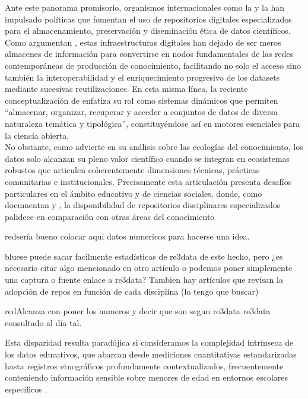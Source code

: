 \documentclass[runningheads]{llncs}
\def \bchregi {\begin{color}{red}}
\def \echregi {\end{color}}
\def \bchgon {\begin{color}{blue}}
\def \echgon {\end{color}}
\begin{document}
Ante este panorama promisorio, organismos internacionales como la \cite{unesco2021} y la \cite{oecd2020} han impulsado políticas que fomentan el uso de repositorios digitales especializados para el almacenamiento, preservación y diseminación ética de datos científicos. Como argumentan \cite{borgman2018}, estas infraestructuras digitales han dejado de ser meros almacenes de información para convertirse en nodos fundamentales de las redes contemporáneas de producción de conocimiento, facilitando no solo el acceso sino también la interoperabilidad y el enriquecimiento progresivo de los datasets mediante sucesivas reutilizaciones. En esta misma línea, la reciente conceptualización de \citet[p.~27]{avila2024} enfatiza su rol como sistemas dinámicos que permiten ``almacenar, organizar, recuperar y acceder a conjuntos de datos de diversa naturaleza temática y tipológica'', constituyéndose así en motores esenciales para la ciencia abierta.\\

No obstante, como advierte \cite{borgman2016} en su análisis sobre las ecologías del conocimiento, los datos solo alcanzan su pleno valor científico cuando se integran en ecosistemas robustos que articulen coherentemente dimensiones técnicas, prácticas comunitarias e institucionales. Precisamente esta articulación presenta desafíos particulares en el ámbito educativo y de ciencias sociales, donde, como documentan \cite{kraehmer2023} y \cite{Lamb2024}, la disponibilidad de repositorios disciplinares especializados palidece en comparación con otras áreas del conocimiento \bchregi sería bueno colocar aqui datos numericos para hacerse una idea. \echregi \bchgon se puede sacar facilmente estadísticas de re3data de este hecho, pero ¿es necesario citar algo mencionado en otro artículo o podemos poner simplemente una captura o fuente enlace a re3data? Tambien hay artículos que revisan la adopción de repos en función de cada disciplina (lo tengo que buscar) \echgon \bchregi Alcanza con poner los numeros y decir que son segun re3data re3data consultado al día tal. \echregi Esta disparidad resulta paradójica si consideramos la complejidad intrínseca de los datos educativos, que abarcan desde mediciones cuantitativas estandarizadas hasta registros etnográficos profundamente contextualizados, frecuentemente conteniendo información sensible sobre menores de edad en entornos escolares específicos \citep{gomes2022}.\\
\end{document}
